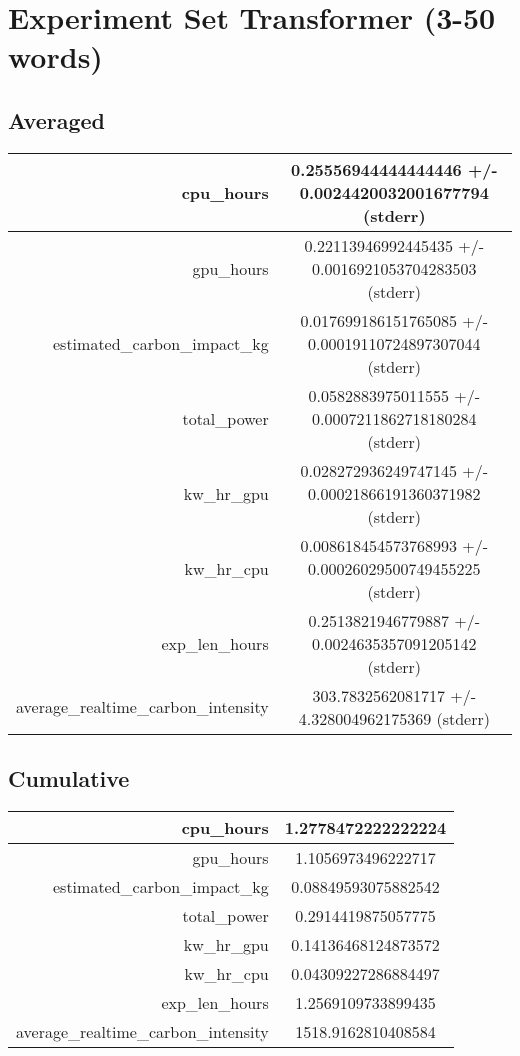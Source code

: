 \documentclass{article}%
\begin{document}
%
\normalsize%
\section{Experiment Set Transformer (3{-}50 words)}%
\label{sec:Experiment Set Transformer (3{-}50 words)}%
\subsection{Averaged}%
\label{subsec:Averaged}%
\begin{tabular}{|r|c|}%
\hline%
cpu\_hours&0.25556944444444446 +/{-} 0.0024420032001677794 (stderr)\\%
\hline%
gpu\_hours&0.22113946992445435 +/{-} 0.0016921053704283503 (stderr)\\%
\hline%
estimated\_carbon\_impact\_kg&0.017699186151765085 +/{-} 0.00019110724897307044 (stderr)\\%
\hline%
total\_power&0.0582883975011555 +/{-} 0.0007211862718180284 (stderr)\\%
\hline%
kw\_hr\_gpu&0.028272936249747145 +/{-} 0.00021866191360371982 (stderr)\\%
\hline%
kw\_hr\_cpu&0.008618454573768993 +/{-} 0.00026029500749455225 (stderr)\\%
\hline%
exp\_len\_hours&0.2513821946779887 +/{-} 0.0024635357091205142 (stderr)\\%
\hline%
average\_realtime\_carbon\_intensity&303.7832562081717 +/{-} 4.328004962175369 (stderr)\\%
\hline%
\end{tabular}

%
\subsection{Cumulative}%
\label{subsec:Cumulative}%
\begin{tabular}{|r|c|}%
\hline%
cpu\_hours&1.2778472222222224\\%
\hline%
gpu\_hours&1.1056973496222717\\%
\hline%
estimated\_carbon\_impact\_kg&0.08849593075882542\\%
\hline%
total\_power&0.2914419875057775\\%
\hline%
kw\_hr\_gpu&0.14136468124873572\\%
\hline%
kw\_hr\_cpu&0.04309227286884497\\%
\hline%
exp\_len\_hours&1.2569109733899435\\%
\hline%
average\_realtime\_carbon\_intensity&1518.9162810408584\\%
\hline%
\end{tabular}

%
\end{document}
